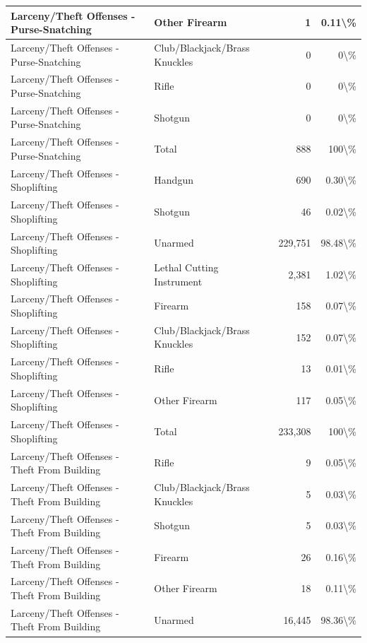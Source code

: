 \documentclass[
]{krantz}
\begin{document}
\begin{longtable}[t]{l|l|r|r}
\hline
Larceny/Theft Offenses - Purse-Snatching & Other Firearm & 1 & 0.11\textbackslash{}\%\\
\hline
Larceny/Theft Offenses - Purse-Snatching & Club/Blackjack/Brass Knuckles & 0 & 0\textbackslash{}\%\\
\hline
Larceny/Theft Offenses - Purse-Snatching & Rifle & 0 & 0\textbackslash{}\%\\
\hline
Larceny/Theft Offenses - Purse-Snatching & Shotgun & 0 & 0\textbackslash{}\%\\
\hline
Larceny/Theft Offenses - Purse-Snatching & Total & 888 & 100\textbackslash{}\%\\
\hline
Larceny/Theft Offenses - Shoplifting & Handgun & 690 & 0.30\textbackslash{}\%\\
\hline
Larceny/Theft Offenses - Shoplifting & Shotgun & 46 & 0.02\textbackslash{}\%\\
\hline
Larceny/Theft Offenses - Shoplifting & Unarmed & 229,751 & 98.48\textbackslash{}\%\\
\hline
Larceny/Theft Offenses - Shoplifting & Lethal Cutting Instrument & 2,381 & 1.02\textbackslash{}\%\\
\hline
Larceny/Theft Offenses - Shoplifting & Firearm & 158 & 0.07\textbackslash{}\%\\
\hline
Larceny/Theft Offenses - Shoplifting & Club/Blackjack/Brass Knuckles & 152 & 0.07\textbackslash{}\%\\
\hline
Larceny/Theft Offenses - Shoplifting & Rifle & 13 & 0.01\textbackslash{}\%\\
\hline
Larceny/Theft Offenses - Shoplifting & Other Firearm & 117 & 0.05\textbackslash{}\%\\
\hline
Larceny/Theft Offenses - Shoplifting & Total & 233,308 & 100\textbackslash{}\%\\
\hline
Larceny/Theft Offenses - Theft From Building & Rifle & 9 & 0.05\textbackslash{}\%\\
\hline
Larceny/Theft Offenses - Theft From Building & Club/Blackjack/Brass Knuckles & 5 & 0.03\textbackslash{}\%\\
\hline
Larceny/Theft Offenses - Theft From Building & Shotgun & 5 & 0.03\textbackslash{}\%\\
\hline
Larceny/Theft Offenses - Theft From Building & Firearm & 26 & 0.16\textbackslash{}\%\\
\hline
Larceny/Theft Offenses - Theft From Building & Other Firearm & 18 & 0.11\textbackslash{}\%\\
\hline
Larceny/Theft Offenses - Theft From Building & Unarmed & 16,445 & 98.36\textbackslash{}\%\\

\end{longtable}
\end{document}
